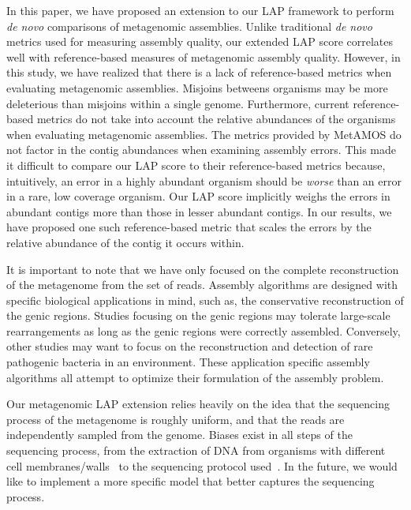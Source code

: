 In this paper, we have proposed an extension to our LAP framework to perform \emph{de novo} comparisons of metagenomic assemblies.
Unlike traditional \emph{de novo} metrics used for measuring assembly quality, our extended LAP score correlates well with reference-based measures of metagenomic assembly quality.
However, in this study, we have realized that there is a lack of reference-based metrics when evaluating metagenomic assemblies.
Misjoins betweens organisms may be more deleterious than misjoins within a single genome.
Furthermore, current reference-based metrics do not take into account the relative abundances of the organisms when evaluating metagenomic assemblies.
The metrics provided by MetAMOS do not factor in the contig abundances when examining assembly errors.
This made it difficult to compare our LAP score to their reference-based metrics because, intuitively, an error in a highly abundant organism should be \emph{worse} than an error in a rare, low coverage organism.
Our LAP score implicitly weighs the errors in abundant contigs more than those in lesser abundant contigs.
In our results, we have proposed one such reference-based metric that scales the errors by the relative abundance of the contig it occurs within.

It is important to note that we have only focused on the complete reconstruction of the metagenome from the set of reads.
Assembly algorithms are designed with specific biological applications in mind, such as, the conservative reconstruction of the genic regions.
Studies focusing on the genic regions may tolerate large-scale rearrangements as long as the genic regions were correctly assembled.
Conversely, other studies may want to focus on the reconstruction and detection of rare pathogenic bacteria in an environment.
These application specific assembly algorithms all attempt to optimize their formulation of the assembly problem.

Our metagenomic LAP extension relies heavily on the idea that the sequencing process of the metagenome is roughly uniform, and that the reads are independently sampled from the genome.
Biases exist in all steps of the sequencing process, from the extraction of DNA from organisms with different cell membranes/walls~\cite{carrigg2007dna,krsek1999comparison} to the sequencing protocol used~\cite{morgan2010metagenomic,temperton2009bias}.
In the future, we would like to implement a more specific model that better captures the sequencing process.


